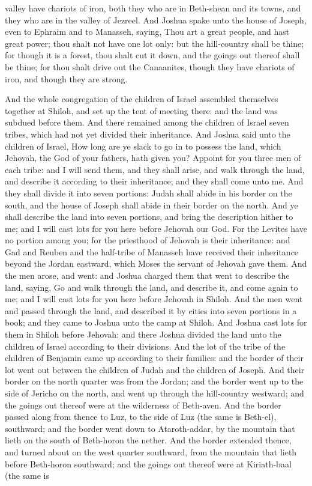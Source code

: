 valley have chariots of iron, both they who are in Beth-shean and its towns, and they who are in the valley of Jezreel. And Joshua spake unto the house of Joseph, even to Ephraim and to Manasseh, saying, Thou art a great people, and hast great power; thou shalt not have one lot only: but the hill-country shall be thine; for though it is a forest, thou shalt cut it down, and the goings out thereof shall be thine; for thou shalt drive out the Canaanites, though they have chariots of iron, and though they are strong. 

And the whole congregation of the children of Israel assembled themselves together at Shiloh, and set up the tent of meeting there: and the land was subdued before them. And there remained among the children of Israel seven tribes, which had not yet divided their inheritance. And Joshua said unto the children of Israel, How long are ye slack to go in to possess the land, which Jehovah, the God of your fathers, hath given you? Appoint for you three men of each tribe: and I will send them, and they shall arise, and walk through the land, and describe it according to their inheritance; and they shall come unto me. And they shall divide it into seven portions: Judah shall abide in his border on the south, and the house of Joseph shall abide in their border on the north. And ye shall describe the land into seven portions, and bring the description hither to me; and I will cast lots for you here before Jehovah our God. For the Levites have no portion among you; for the priesthood of Jehovah is their inheritance: and Gad and Reuben and the half-tribe of Manasseh have received their inheritance beyond the Jordan eastward, which Moses the servant of Jehovah gave them.  And the men arose, and went: and Joshua charged them that went to describe the land, saying, Go and walk through the land, and describe it, and come again to me; and I will cast lots for you here before Jehovah in Shiloh. And the men went and passed through the land, and described it by cities into seven portions in a book; and they came to Joshua unto the camp at Shiloh. And Joshua cast lots for them in Shiloh before Jehovah: and there Joshua divided the land unto the children of Israel according to their divisions.  And the lot of the tribe of the children of Benjamin came up according to their families: and the border of their lot went out between the children of Judah and the children of Joseph. And their border on the north quarter was from the Jordan; and the border went up to the side of Jericho on the north, and went up through the hill-country westward; and the goings out thereof were at the wilderness of Beth-aven. And the border passed along from thence to Luz, to the side of Luz (the same is Beth-el), southward; and the border went down to Ataroth-addar, by the mountain that lieth on the south of Beth-horon the nether. And the border extended thence, and turned about on the west quarter southward, from the mountain that lieth before Beth-horon southward; and the goings out thereof were at Kiriath-baal (the same is 